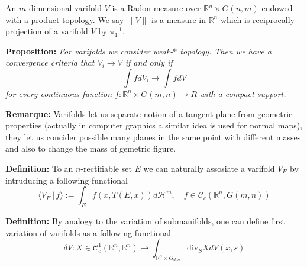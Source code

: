 An $m$-dimensional varifold $V$ is a Radon measure over $\mathbb{R}^n\times
G(n,m)$ endowed with a product topology. We say $\|V\|$ is a measure in
$\mathbb{R}^n$ which is reciprocally projection of a varifold $V$ by $\pi_1^{-1}$.

\vspace{2ex}
\textbf{Proposition:} \textit{For varifolds we consider weak-$*$ topology. Then we have a
convergence criteria that $V_i\rightarrow V$ if and only if
\[\int fdV_i\rightarrow\int fdV\]
for every continuous function $f:\mathbb{R}^n\times G(m,n)\rightarrow R$ with a
compact support.}

\textbf{Remarque:} Varifolds let us separate notion of a tangent plane from
geometric properties (actually in computer graphics a similar idea is used for
normal maps), they let us concider possible many planes in the same point with
different masses and also to change the mass of gemetric figure.

\vspace{2ex}
\textbf{Definition:} To an $n$-rectifiable set $E$ we can naturally assosiate
a varifold $V_E$ by intruducing a following functional
\[\langle V_E\,|\, f\rangle:=\int_Ef(x,T(E,x))d\mathcal H^m,\quad f\in\mathcal C_c(\mathbb R^n, G(m,n))\]

\vspace{2ex}
\textbf{Definition:} By analogy to the variation of submanifolds, one can define
first variation of varifolds as a following functional
\[\delta V:X\in\mathcal C^1_c(\mathbb R^n,\mathbb R^n)\rightarrow\int_{\mathbb R^n\times G_{d,n}}\text{div}_SXdV(x,s)\]
